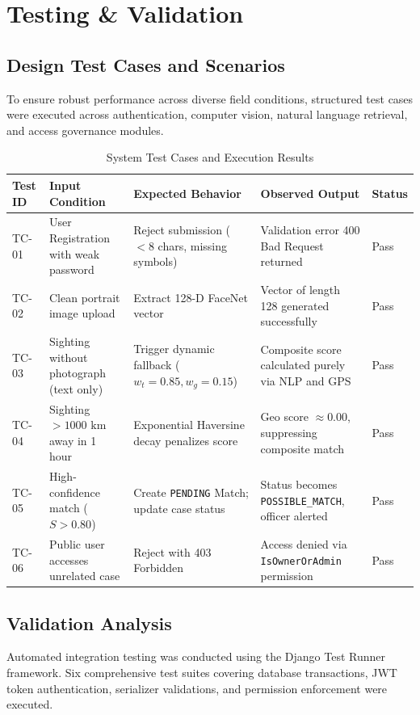 \documentclass[12pt,a4paper]{report}
\begin{document}
\section{Testing \& Validation}

\subsection{Design Test Cases and Scenarios}
To ensure robust performance across diverse field conditions, structured test cases were executed across authentication, computer vision, natural language retrieval, and access governance modules.

\begin{table}[H]
\centering
\caption{System Test Cases and Execution Results}
\label{tab:test_cases}
\small
\begin{tabularx}{\textwidth}{p{0.4in}p{1.4in}p{1.6in}p{1.4in}p{0.5in}}
\toprule
\textbf{Test ID} & \textbf{Input Condition} & \textbf{Expected Behavior} & \textbf{Observed Output} & \textbf{Status} \\
\midrule
TC-01 & User Registration with weak password & Reject submission ($<8$ chars, missing symbols) & Validation error 400 Bad Request returned & Pass \\
TC-02 & Clean portrait image upload & Extract 128-D FaceNet vector & Vector of length 128 generated successfully & Pass \\
TC-03 & Sighting without photograph (text only) & Trigger dynamic fallback ($w_t = 0.85, w_g = 0.15$) & Composite score calculated purely via NLP and GPS & Pass \\
TC-04 & Sighting $>1000\text{ km}$ away in 1 hour & Exponential Haversine decay penalizes score & Geo score $\approx 0.00$, suppressing composite match & Pass \\
TC-05 & High-confidence match ($S > 0.80$) & Create \texttt{PENDING} Match; update case status & Status becomes \texttt{POSSIBLE\_MATCH}, officer alerted & Pass \\
TC-06 & Public user accesses unrelated case & Reject with 403 Forbidden & Access denied via \texttt{IsOwnerOrAdmin} permission & Pass \\
\bottomrule
\end{tabularx}
\end{table}

\subsection{Validation Analysis}
Automated integration testing was conducted using the Django Test Runner framework. Six comprehensive test suites covering database transactions, JWT token authentication, serializer validations, and permission enforcement were executed.
\end{document}
